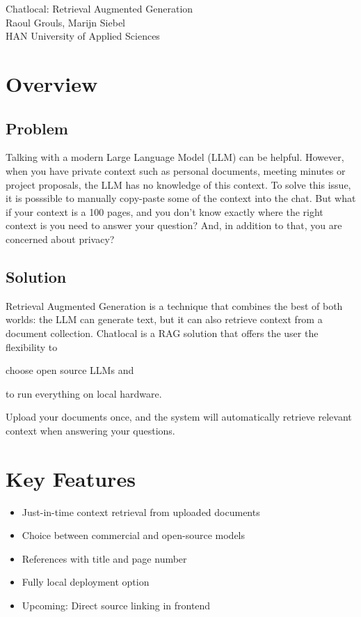 \documentclass[a4paper,10pt]{article}
\begin{document}
\begin{center}
\Large Chatlocal: Retrieval Augmented Generation\\[0.8em]
\small Raoul Grouls, Marijn Siebel\\[0.4em]
\footnotesize HAN University of Applied Sciences\\[3em]
\end{center}

\begin{multicols}{2}
\section{Overview}
\subsection{Problem}
Talking with a modern Large Language Model (LLM) can be helpful. However, when you have private context such as personal documents, meeting minutes or project proposals, the LLM has no knowledge of this context. To solve this issue, it is posssible to manually copy-paste some of the context into the chat. But what if your context is a 100 pages, and you don't know exactly where the right context is you need to answer your question? And, in addition to that, you are concerned about privacy? 
\subsection{Solution}
Retrieval Augmented Generation is a technique that combines the best of both worlds: the LLM can generate text, but it can also retrieve context from a document collection. Chatlocal is a RAG solution that offers the user the flexibility to \begin{enumerate*}[a)]\item choose open source LLMs and \item to run everything on local hardware.\end{enumerate*} Upload your documents once, and the system will automatically retrieve relevant context when answering your questions. 
\section{Key Features}
\begin{itemize}
\item Just-in-time context retrieval from uploaded documents
\item Choice between commercial and open-source models
\item References with title and page number
\item Fully local deployment option
\item Upcoming: Direct source linking in frontend
\end{itemize}

\end{multicols}
\end{document}
